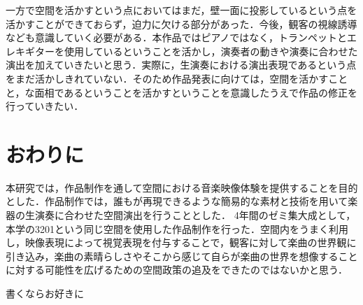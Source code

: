 一方で空間を活かすという点においてはまだ，壁一面に投影しているという点を活かすことができておらず，迫力に欠ける部分があった．今後，観客の視線誘導なども意識していく必要がある．本作品ではピアノではなく，トランペットとエレキギターを使用しているということを活かし，演奏者の動きや演奏に合わせた演出を加えていきたいと思う．実際に，生演奏における演出表現であるという点をまだ活かしきれていない．そのため作品発表に向けては，空間を活かすことと，な面相であるということを活かすということを意識したうえで作品の修正を行っていきたい．


\section{おわりに}
本研究では，作品制作を通して空間における音楽映像体験を提供することを目的とした．作品制作では，誰もが再現できるような簡易的な素材と技術を用いて楽器の生演奏に合わせた空間演出を行うこととした． 4年間のゼミ集大成として，本学の3201という同じ空間を使用した作品制作を行った．空間内をうまく利用し，映像表現によって視覚表現を付与することで，観客に対して楽曲の世界観に引き込み，楽曲の素晴らしさやそこから感じて自らが楽曲の世界を想像することに対する可能性を広げるための空間政策の追及をできたのではないかと思う．






\begin{acknowledgment}
	書くならお好きに
\end{acknowledgment}

